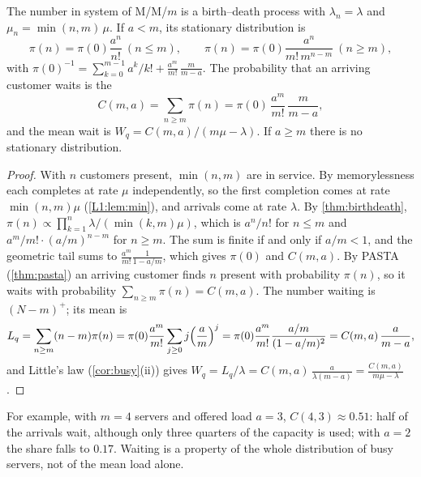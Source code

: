 \begin{proposition}\label{prop:mmm}
The number in system of M/M/$m$ is a birth--death process with $\lambda_n=\lambda$ and
$\mu_n=\min(n,m)\,\mu$. If $a<m$, its stationary distribution is
\[
  \pi(n)=\pi(0)\frac{a^n}{n!}\ (n\le m),\qquad
  \pi(n)=\pi(0)\frac{a^n}{m!\,m^{n-m}}\ (n\ge m),
\]
with $\pi(0)^{-1}=\sum_{k=0}^{m-1}a^k/k!+\frac{a^m}{m!}\,\frac{m}{m-a}$.
The probability that an arriving customer waits is the 
\[
  C(m,a)=\sum_{n\ge m}\pi(n)=\pi(0)\,\frac{a^m}{m!}\,\frac{m}{m-a},
\]
and the mean wait is $W_q=C(m,a)/(m\mu-\lambda)$. If $a\ge m$ there is no stationary
distribution.
\end{proposition}

\begin{proof}
With $n$ customers present, $\min(n,m)$ are in service. By memorylessness each
completes at rate $\mu$ independently, so the first completion comes at rate
$\min(n,m)\mu$ (\cref{L1:lem:min}), and arrivals come at rate $\lambda$. By
\cref{thm:birthdeath}, $\pi(n)\propto\prod_{k=1}^n\lambda/(\min(k,m)\mu)$, which is
$a^n/n!$ for $n\le m$ and $a^m/m!\cdot(a/m)^{n-m}$ for $n\ge m$. The sum is finite if
and only if $a/m<1$, and the geometric tail sums to $\frac{a^m}{m!}\frac{1}{1-a/m}$,
which gives $\pi(0)$ and $C(m,a)$. By PASTA (\cref{thm:pasta}) an arriving customer
finds $n$ present with probability $\pi(n)$, so it waits with probability
$\sum_{n\ge m}\pi(n)=C(m,a)$. The number waiting is $(N-m)^+$; its mean is
\[
  L_q=\sum_{n\ge m}(n-m)\pi(n)=\pi(0)\frac{a^m}{m!}\sum_{j\ge0}j\Bigl(\frac am\Bigr)^j
  =\pi(0)\frac{a^m}{m!}\frac{a/m}{(1-a/m)^2}=C(m,a)\,\frac{a}{m-a},
\]
and Little's law (\cref{cor:busy}(ii)) gives
$W_q=L_q/\lambda=C(m,a)\,\frac{a}{\lambda(m-a)}=\frac{C(m,a)}{m\mu-\lambda}$.
\end{proof}

For example, with $m=4$ servers and offered load $a=3$, $C(4,3)\approx0.51$: half of the
arrivals wait, although only three quarters of the capacity is used; with $a=2$ the
share falls to $0.17$. Waiting is a property of the whole distribution of busy
servers, not of the mean load alone.

